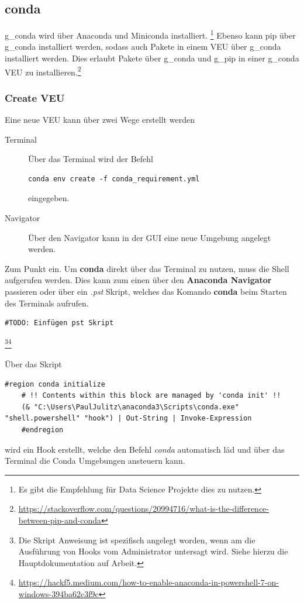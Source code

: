 \subsection{conda}

\gls{g_conda} wird über Anaconda und Miniconda installiert. \footnote{
	Es gibt die Empfehlung für Data Science Projekte dies zu nutzen.
}
Ebenso kann pip über \gls{g_conda} installiert werden, sodass auch Pakete in einem \gls{VEU} über \gls{g_conda} installiert werden. Dies erlaubt Pakete über \gls{g_conda} und \gls{g_pip} in einer \gls{g_conda} \gls{VEU} zu installieren.\footnote{
	\href{Quelle}{https://stackoverflow.com/questions/20994716/what-is-the-difference-between-pip-and-conda}
}

\subsubsection{Create VEU} 
Eine neue \gls{VEU} kann über zwei Wege erstellt werden
\begin{description}
	\item[Terminal] Über das Terminal wird der Befehl
	\begin{lstlisting}[style=CMD]
	conda env create -f conda_requirement.yml
	\end{lstlisting} eingegeben. 
	\item[Navigator] Über den Navigator kann in der \gls{GUI} eine neue Umgebung angelegt werden.
\end{description}

Zum Punkt ein. Um \textbf{conda} direkt über das Terminal zu nutzen, muss die Shell aufgerufen werden. Dies kann zum einen über den \textbf{Anaconda Navigator} passieren oder über ein \textit{.pst} Skript, welches das Komando  \textbf{conda} beim Starten des Terminals aufrufen.
\begin{lstlisting}[style=Config]
	#TODO: Einfügen pst Skript
\end{lstlisting}
\footnote{
	Die Skript Anweisung ist spezifisch angelegt worden, wenn am die Ausführung von Hooks vom Administrator untersagt wird.	 Siehe hierzu die Hauptdokumentation auf Arbeit.
}\footnote{
 \href{Quelle}{https://hackf5.medium.com/how-to-enable-anaconda-in-powershell-7-on-windows-394ba62c3f9c} 
}

Über das Skript
\begin{lstlisting}[style=CMD]
	#region conda initialize
	# !! Contents within this block are managed by 'conda init' !!
	(& "C:\Users\PaulJulitz\anaconda3\Scripts\conda.exe" "shell.powershell" "hook") | Out-String | Invoke-Expression
	#endregion
\end{lstlisting} wird ein Hook erstellt, welche den Befehl \textit{conda} automatisch läd und über das Terminal die Conda Umgebungen ansteuern kann.

